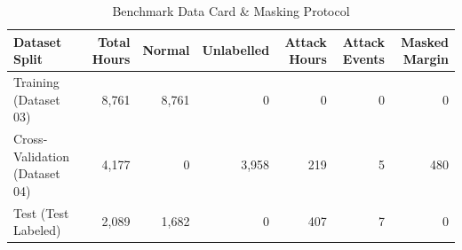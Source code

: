 \begin{table}[htbp]
\centering
\caption{Benchmark Data Card \& Masking Protocol}
\label{tab:data_card}
\begin{tabular}{lrrrrrr}
\toprule
Dataset Split & Total Hours & Normal & Unlabelled & Attack Hours & Attack Events & Masked Margin \\
\midrule
Training (Dataset 03) & 8,761 & 8,761 & 0 & 0 & 0 & 0 \\
Cross-Validation (Dataset 04) & 4,177 & 0 & 3,958 & 219 & 5 & 480 \\
Test (Test Labeled) & 2,089 & 1,682 & 0 & 407 & 7 & 0 \\
\bottomrule
\end{tabular}
\end{table}
